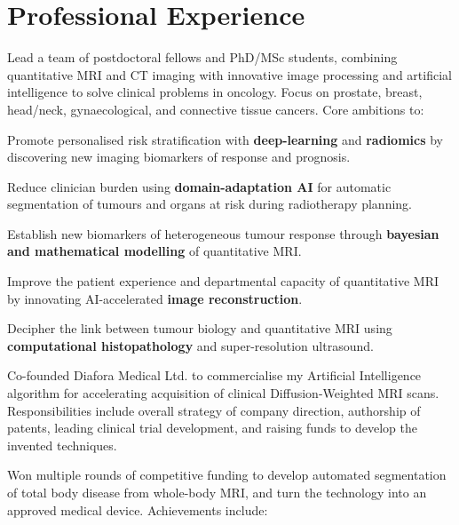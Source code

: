 \documentclass[]{mbcv}
\begin{document}
\begin{minipage}[t]{0.65\textwidth}

\section{Professional Experience}
Lead a team of postdoctoral fellows and PhD/MSc students, combining quantitative MRI and CT imaging with innovative image processing and artificial intelligence to solve clinical problems in oncology. Focus on prostate, breast, head/neck, gynaecological, and connective tissue cancers. Core ambitions to:
 
\vspace*{15pt}
\begin{tightemize}
\item Promote personalised risk stratification with \textbf{deep-learning} and \textbf{radiomics} by discovering new imaging biomarkers of response and prognosis.
\item Reduce clinician burden using \textbf{domain-adaptation AI} for automatic segmentation of tumours and organs at risk during radiotherapy planning.
\item Establish new biomarkers of heterogeneous tumour response through \textbf{bayesian and mathematical modelling} of quantitative MRI.
\item Improve the patient experience and departmental capacity of quantitative MRI by innovating AI-accelerated \textbf{image reconstruction}.
\item Decipher the link between tumour biology and quantitative MRI using \textbf{computational histopathology} and super-resolution ultrasound.
\end{tightemize}

\sectionsep

Co-founded Diafora Medical Ltd. to commercialise my Artificial Intelligence algorithm for accelerating acquisition of clinical Diffusion-Weighted MRI scans. Responsibilities include overall strategy of company direction, authorship of patents, leading clinical trial development, and raising funds to develop the invented techniques.

\sectionsep

Won multiple rounds of competitive funding to develop automated segmentation of total body disease from whole-body MRI, and turn the technology into an approved medical device. Achievements include:


\end{minipage}
\end{document}
